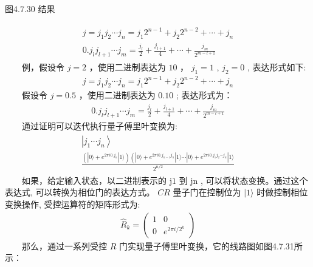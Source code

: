 \documentclass[a4paper,11pt,english]{sphinxmanual}
\begin{document}
\begin{center}图4.7.30 结果
\end{center}
\sphinxAtStartPar
{}
\begin{equation*}
\begin{split}\begin{array}{c}j=j_{1} j_{2} \cdots j_{n}=j_{1} 2^{n-1}+j_{2} 2^{n-2}+\cdots+j_{n} \\0 . j_{l} j_{l+1} \cdots j_{m}=\frac{j_{l}}{2}+\frac{j_{l+1}}{4}+\cdots+\frac{j_{m}}{2^{m-l+1}}\end{array}\end{split}
\end{equation*}
\sphinxAtStartPar
  例，假设令  \(j=2\) ，使用二进制表达为 \(10\) ， \(j_{1}=1\) , \(j_{2}=0\) , 表达形式如下:
\begin{equation*}
\begin{split}j=j_{1} j_{2} \cdots j_{n}=j_{1}{2^{n-1}}+j_{2}{2^{n-2}}+\cdots+j_{n}\end{split}
\end{equation*}
\sphinxAtStartPar
  假设令  \(j=0.5\) ，使用二进制表达为  \(0.10\) ; 表达形式为：
\begin{equation*}
\begin{split}0 . j_{l} j_{l+1} \cdots j_{m}=\frac{j_{l}}{2}+\frac{j_{l+1}}{4}+\cdots+\frac{j_{m}}{2^{m-l+1}}\end{split}
\end{equation*}
\sphinxAtStartPar
  通过证明可以迭代执行量子傅里叶变换为:
\begin{equation*}
\begin{split}\begin{array}{c} \left|j_{1} \cdots j_{n}\right\rangle \\ \frac{\left(|0\rangle+e^{2 \pi i 0 . j_{n}}|1\rangle\right)\left(|0\rangle+e^{2 \pi i 0 . j_{n-1} j_{n}}|1\rangle \cdots|0\rangle+e^{2 \pi i 0 . j_{1} j_{2} \cdots j_{n}}|1\rangle\right.}{2^{n / 2}} \end{array}\end{split}
\end{equation*}
\sphinxAtStartPar
  如果，给定输入状态，以二进制表示的  \(\mathrm{j}{1}\) 到  \(\mathrm{j}{\mathrm{n}}\) , 可以将状态变换。通过这个表达式, 可以转换为相位门的表达方式。 \(CR\) 量子门在控制位为 \(|1\rangle\) 时做控制相位变换操作, 受控运算符的矩阵形式为:
\begin{equation*}
\begin{split}\hat{R}_{k}=\left(\begin{array}{cc} 1 & 0 \\ 0 & e^{2 \pi i / 2^{k}} \end{array}\right)\end{split}
\end{equation*}
\sphinxAtStartPar
  那么，通过一系列受控 \(R\) 门实现量子傅里叶变换，它的线路图如图4.7.31所示：
\end{document}
